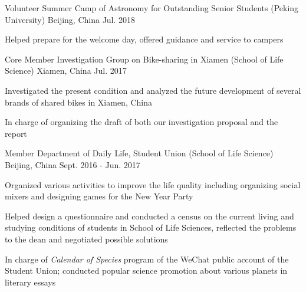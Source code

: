 


\begin{cventries}


\cventry
{Volunteer} %
{Summer Camp of Astronomy for Outstanding Senior Students (Peking University)} %
{Beijing, China} %
{Jul. 2018} %
{ %
	\begin{cvitems}
		\item {Helped prepare for the welcome day, offered guidance and service to campers}
	\end{cvitems}
}


\cventry
{Core Member} %
{Investigation Group on Bike-sharing in Xiamen (School of Life Science)} %
{Xiamen, China} %
{Jul. 2017} %
{ %
\begin{cvitems}
\item {Investigated the present condition and analyzed the future development of several brands of shared bikes in Xiamen, China}
\item {In charge of organizing the draft of both our investigation proposal and the report}
\end{cvitems}
}


\cventry
{Member} %
{Department of Daily Life, Student Union (School of Life Science)} %
{Beijing, China} %
{Sept. 2016 - Jun. 2017} %
{ %
\begin{cvitems}
\item {Organized various activities to improve the life quality including organizing social mixers and designing games for the New Year Party}
\item {Helped design a questionnaire and conducted a census on the current living and studying conditions of students in School of Life Sciences, reflected the problems to the dean and negotiated possible solutions}
\item {In charge of \textit{Calendar of Species} program of the WeChat public account of the Student Union; conducted popular science promotion about various planets in literary essays}
\end{cvitems}
}


\end{cventries}